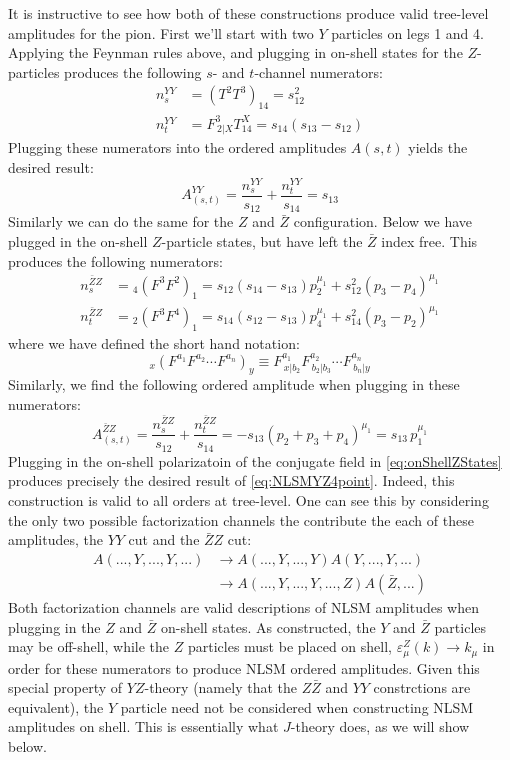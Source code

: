 \documentclass[11pt,letter]{article}
\def\be{\begin{equation}}
\begin{document}
It is instructive to see how both of these constructions produce valid tree-level amplitudes for the pion. First we'll start with two $Y$ particles on legs 1 and 4. Applying the Feynman rules above, and plugging in on-shell states for the $Z$-particles produces the following $s$- and $t$-channel numerators:
\begin{align}
n^{YY}_s &= (T^2T^3)_{14} = s_{12}^2 
\\
 n^{YY}_t &=  F^{3}_{\,2|X}T^X_{14}  = s_{14}(s_{13}-s_{12})
\end{align}
Plugging these numerators into the ordered amplitudes $A(s,t)$ yields the desired result:
\be\label{eq:NLSMYZ4point}
A^{YY}_{(s,t)} = \frac{n^{YY}_s}{s_{12}}+\frac{ n^{YY}_t }{s_{14}} = s_{13}
\end{equation}
Similarly we can do the same for the $Z$ and $\bar{Z}$ configuration. Below we have plugged in the on-shell $Z$-particle states, but have left the $\bar{Z}$ index free. This produces the following numerators:
\begin{align}
n^{\bar{Z}Z}_s &= {}_4(F^{3}F^{2})_{1} =  s_{12}(s_{14}-s_{13})p_2^{\mu_1}+s_{12}^2(p_3-p_4)^{\mu_1}
\\
 n^{\bar{Z}Z}_t &=   {}_2(F^{3}F^{4})_{1}  = s_{14}(s_{12}-s_{13})p_4^{\mu_1}+s_{14}^2(p_3-p_2)^{\mu_1}
\end{align}
where we have defined the short hand notation:
\begin{equation}
{}_x(F^{a_1}F^{a_2}\cdots F^{a_n})_{y} \equiv F^{a_1}_{\,x|b_2}F^{a_2}_{\,b_2|b_3}\cdots F^{a_n}_{\,b_n|y}
\end{equation}
Similarly, we find the following ordered amplitude when plugging in these numerators:
\begin{equation}
A^{\bar{Z}Z}_{(s,t)} = \frac{n^{\bar{Z}Z}_s}{s_{12}}+\frac{ n^{\bar{Z}Z}_t }{s_{14}} = -s_{13}(p_2+p_3+p_4)^{\mu_1} = s_{13} \,p_1^{\mu_1}
\end{equation}
Plugging in the on-shell polarizatoin of the conjugate field in \cref{eq:onShellZStates} produces precisely the desired result of \cref{eq:NLSMYZ4point}. Indeed, this construction is valid to all orders at tree-level. One can see this by considering the only two possible factorization channels the contribute the each of these amplitudes, the $YY$ cut and the $\bar{Z}Z$ cut:
\begin{align}
A(...,Y,...,Y,...) &\rightarrow A(...,Y,...,Y)A(Y,...,Y,...)
\\
&\rightarrow A(...,Y,...,Y,...,Z)A(\bar{Z},...)
\end{align}
Both factorization channels are valid descriptions of NLSM amplitudes when plugging in the $Z$ and $\bar{Z}$ on-shell states. As constructed, the $Y$ and $\bar{Z}$ particles may be off-shell, while the $Z$ particles must be placed on shell, $\varepsilon^Z_\mu(k)\rightarrow k_\mu$ in order for these numerators to produce NLSM ordered amplitudes. Given this special property of $YZ$-theory (namely that the $Z\bar{Z}$ and $YY$ constrctions are equivalent), the $Y$ particle need not be considered when constructing NLSM amplitudes on shell. This is essentially what $J$-theory does, as we will show below.
\end{document}
